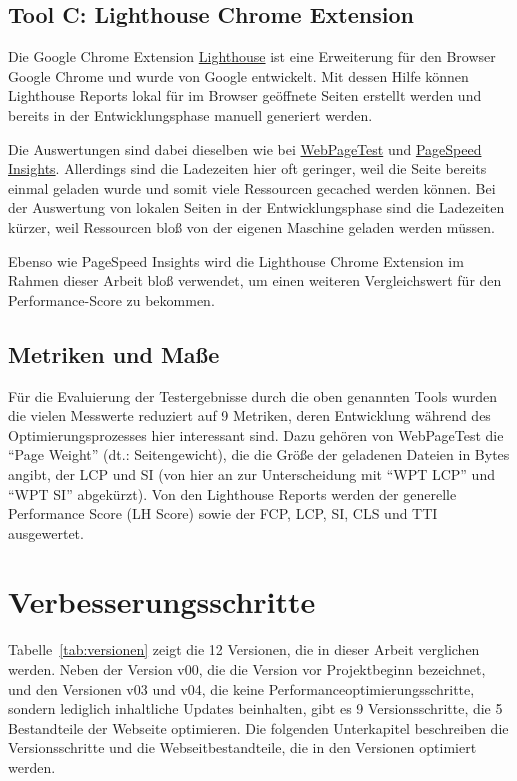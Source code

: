 \documentclass[11pt,a4paper]{article}
\begin{document}
\subsection{Tool C: Lighthouse Chrome Extension}\label{subsec:Lighthouse}
Die Google Chrome Extension \href{https://chromewebstore.google.com/detail/lighthouse/blipmdconlkpinefehnmjammfjpmpbjk}{Lighthouse} ist eine Erweiterung für den Browser Google Chrome und wurde von Google entwickelt.
Mit dessen Hilfe können Lighthouse Reports lokal für im Browser geöffnete Seiten erstellt werden und bereits in der Entwicklungsphase manuell generiert werden.

Die Auswertungen sind dabei dieselben wie bei \hyperref[subsec:WebPageTest]{WebPageTest} und \hyperref[subsec:PageSpeed]{PageSpeed Insights}.
Allerdings sind die Ladezeiten hier oft geringer, weil die Seite bereits einmal geladen wurde und somit viele Ressourcen gecached werden können.
Bei der Auswertung von lokalen Seiten in der Entwicklungsphase sind die Ladezeiten kürzer, weil Ressourcen bloß von der eigenen Maschine geladen werden müssen.

Ebenso wie PageSpeed Insights wird die Lighthouse Chrome Extension im Rahmen dieser Arbeit bloß verwendet, um einen weiteren Vergleichswert für den Performance-Score zu bekommen.

\subsection{Metriken und Maße}
Für die Evaluierung der Testergebnisse durch die oben genannten Tools wurden die vielen Messwerte reduziert auf 9 Metriken, deren Entwicklung während des Optimierungsprozesses hier interessant sind.
Dazu gehören von WebPageTest die \enquote{Page Weight} (dt.: Seitengewicht), die die Größe der geladenen Dateien in Bytes angibt, der LCP und SI (von hier an zur Unterscheidung mit \enquote{WPT LCP} und \enquote{WPT SI} abgekürzt).
Von den Lighthouse Reports werden der generelle Performance Score (LH Score) sowie der FCP, LCP, SI, CLS und TTI ausgewertet.

\section{Verbesserungsschritte}
Tabelle~\ref{tab:versionen} zeigt die 12 Versionen, die in dieser Arbeit verglichen werden.
Neben der Version v00, die die Version vor Projektbeginn bezeichnet, und den Versionen v03 und v04, die keine Performanceoptimierungsschritte, sondern lediglich inhaltliche Updates beinhalten, gibt es 9 Versionsschritte, die 5 Bestandteile der Webseite optimieren.
Die folgenden Unterkapitel beschreiben die Versionsschritte und die Webseitbestandteile, die in den Versionen optimiert werden.
\end{document}
